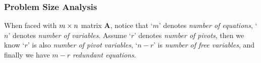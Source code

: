\subsubsection{Problem Size Analysis}
When faced with $m\times n$ matrix $\bm A$, notice that `$m$' denotes \emph{number of equations}, `$n$' denotes \emph{number of variables}. Assume `$r$' denotes \emph{number of pivots}, then we know `$r$' is also \emph{number of pivot variables}, `$n-r$' is \emph{number of free variables}, and finally we have $m-r$ \emph{redundant equations}.










